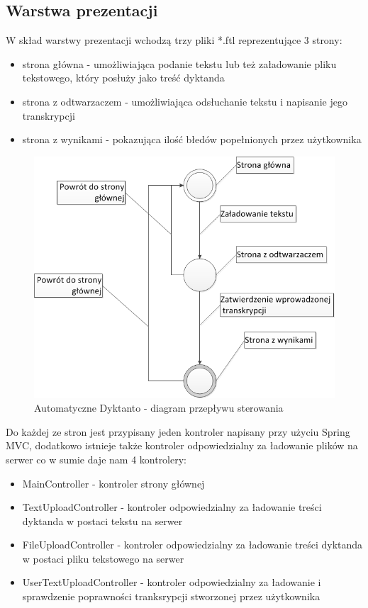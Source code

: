 \subsection{Warstwa prezentacji}
W skład warstwy prezentacji wchodzą trzy pliki *.ftl reprezentujące 3 strony:
\begin{itemize}
	\item strona główna - umożliwiająca podanie tekstu lub też załadowanie pliku tekstowego, który posłuży jako treść dyktanda
	\item strona z odtwarzaczem - umożliwiająca odsłuchanie tekstu i napisanie jego transkrypcji
	\item strona z wynikami - pokazująca ilość błedów popełnionych przez użytkownika
\end{itemize}
\begin{figure}[!h]
	\centering
	\includegraphics[scale=0.45]{AutomaticDictandoControlDiagram.png} 
	\caption{Automatyczne Dyktanto - diagram przepływu sterowania}
\end{figure}
\newpage
Do każdej ze stron jest przypisany jeden kontroler napisany przy użyciu Spring MVC, dodatkowo istnieje także kontroler odpowiedzialny za ładowanie plików na serwer co w sumie daje nam 4 kontrolery:
\begin{itemize}
	\item MainController - kontroler strony głównej
	\item TextUploadController - kontroler odpowiedzialny za ładowanie treści dyktanda w postaci tekstu na serwer
	\item FileUploadController - kontroler odpowiedzialny za ładowanie treści dyktanda w postaci pliku tekstowego na serwer
	\item UserTextUploadController - kontroler odpowiedzialny za ładowanie i sprawdzenie poprawności tranksrypcji stworzonej przez użytkownika
\end{itemize}
